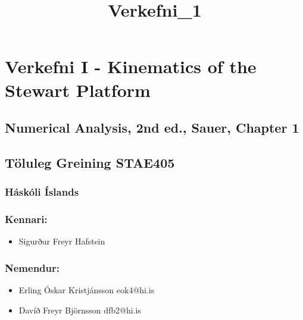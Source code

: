 \documentclass[11pt]{article}
\title{Verkefni\_1}
\providecommand{\tightlist}{%
      \setlength{\itemsep}{0pt}\setlength{\parskip}{0pt}}
\begin{document}
    
    
    \maketitle
    
    

    
    \hypertarget{verkefni-i---kinematics-of-the-stewart-platform}{%
\section*{Verkefni I - Kinematics of the Stewart
Platform}\label{verkefni-i---kinematics-of-the-stewart-platform}}

\hypertarget{numerical-analysis-2nd-ed.-sauer-chapter-1}{%
\subsection*{Numerical Analysis, 2nd ed., Sauer, Chapter
1}\label{numerical-analysis-2nd-ed.-sauer-chapter-1}}

\hypertarget{tuxf6luleg-greining-stae405}{%
\subsection*{Töluleg Greining
STAE405}\label{tuxf6luleg-greining-stae405}}

\hypertarget{huxe1skuxf3li-uxedslands}{%
\subsubsection*{Háskóli Íslands}\label{huxe1skuxf3li-uxedslands}}

\hypertarget{kennari}{%
\subsubsection*{Kennari:}\label{kennari}}

\begin{itemize}
\tightlist
\item
  Sigurður Freyr Hafstein
\end{itemize}

\hypertarget{nemendur}{%
\subsubsection*{Nemendur:}\label{nemendur}}

\begin{itemize}
\tightlist
\item
  Erling Óskar Kristjánsson eok4@hi.is
\item
  Davíð Freyr Björnsson dfb2@hi.is
\end{itemize}
\end{document}
